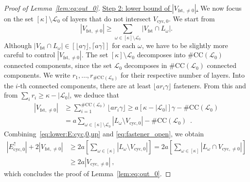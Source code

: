 \documentclass[10pt,a4paper]{amsart}
\begin{document}
\begin{proof}[Proof of Lemma~\ref{lem:eq:out_0}]
\noindent
\underline{Step 2: lower bound of $|V_{\mathrm{fst},\neq 0}|$.} We now focus on the set $[\kappa]\setminus \mathcal{L}_0$ of layers that do not intersect $V_{\mathrm{cyc},0}$. We start from 
\[
|V_{\mathrm{fst},\neq 0}|\geq \sum_{\omega\in [\kappa]\setminus \mathcal{L}_0} |V_{\mathrm{fst}}\cap L_{\omega}|.
\]
Although $|V_{\mathrm{fst}}\cap L_{\omega}|\in [\lfloor a\gamma\rfloor, \lceil a\gamma\rceil]$ for each $\omega$, we have to be slightly more careful to control $|V_{\mathrm{fst},\neq 0}|$. The set $[\kappa]\setminus \mathcal{L}_0$ decomposes into $\#\mathrm{CC}(\mathcal L_0)$ connected components, since the set $\mathcal L_0$ decomposes in $\#\mathrm{CC}(\mathcal L_0)$ connected components. We write $r_1,\ldots, r_{\#\mathrm{CC}(\mathcal L_0)}$ for their respective number of layers. Into the $i$-th connected components, there are at least $\lfloor a r_i\gamma\rfloor$ fasteners. From this and from $\sum_i r_i \geq \kappa - |\mathcal L_0|$, we deduce that 
\begin{align}\nonumber
|V_{\mathrm{fst},\neq 0}|&\geq \sum_{i=1}^{\#\mathrm{CC}(\mathcal L_0)} \lfloor a r_i \gamma\rfloor \geq a \left[\kappa - |\mathcal{L}_0|\right]\gamma - \#\mathrm{CC}(\mathcal L_0)\\
&= a \sum_{\omega\in [\kappa]\setminus \mathcal L_0}|L_{\omega}\setminus V_{\mathrm{cyc},0}|   - \#\mathrm{CC}(\mathcal L_0)\enspace . \label{eq:fastener_open}
\end{align}
Combining~\eqref{eq:lower:E:cyc,0,up} and \eqref{eq:fastener_open}, we obtain 
\begin{align*}
|E_{\mathrm{cyc},0}^{\uparrow}|+ 2 |V_{\mathrm{fst},\neq 0}| &\geq  2a \left[\sum_{\omega\in [\kappa]}|L_{\omega}\setminus V_{\mathrm{cyc},0}| \right] =  2a \left[\sum_{\omega\in [\kappa]}|L_{\omega}\cap V_{\mathrm{cyc},\neq 0}| \right]\\
& \geq 2a |V_{\mathrm{cyc},\neq 0}|\ ,
\end{align*}
which concludes the proof of Lemma~\ref{lem:eq:out_0}.
\end{proof}
\end{document}
